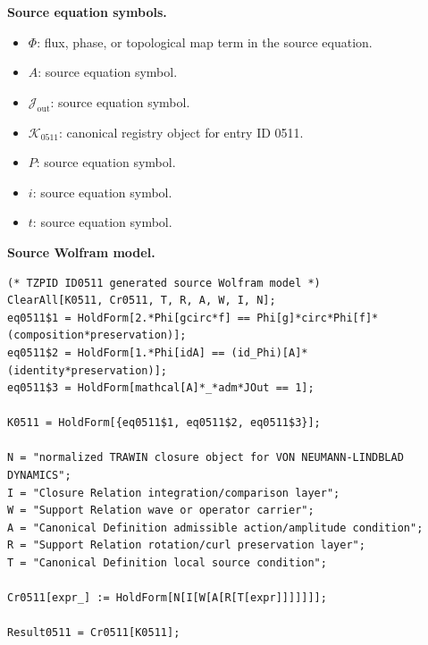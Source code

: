 \begin{minipage}[t]{0.49\linewidth}
\begingroup
\small
\raggedright
\textbf{Source equation symbols.}\par
\begin{itemize}[leftmargin=1.35em,itemsep=1pt,topsep=1pt,parsep=0pt]
    \item $\Phi$: flux, phase, or topological map term in the source equation.
    \item $A$: source equation symbol.
    \item $\mathcal{J}_{\mathrm{out}}$: source equation symbol.
    \item $\mathcal{K}_{0511}$: canonical registry object for entry ID 0511.
    \item $P$: source equation symbol.
    \item $i$: source equation symbol.
    \item $t$: source equation symbol.
\end{itemize}
\endgroup
\end{minipage}\hfill
\begin{minipage}[t]{0.47\linewidth}
\begingroup
\scriptsize
\raggedright
\textbf{Source Wolfram model.}\par
\begin{Verbatim}[fontsize=\tiny,breaklines=true,breakanywhere=true]
(* TZPID ID0511 generated source Wolfram model *)
ClearAll[K0511, Cr0511, T, R, A, W, I, N];
eq0511$1 = HoldForm[2.*Phi[gcirc*f] == Phi[g]*circ*Phi[f]*(composition*preservation)];
eq0511$2 = HoldForm[1.*Phi[idA] == (id_Phi)[A]*(identity*preservation)];
eq0511$3 = HoldForm[mathcal[A]*_*adm*JOut == 1];

K0511 = HoldForm[{eq0511$1, eq0511$2, eq0511$3}];

N = "normalized TRAWIN closure object for VON NEUMANN-LINDBLAD DYNAMICS";
I = "Closure Relation integration/comparison layer";
W = "Support Relation wave or operator carrier";
A = "Canonical Definition admissible action/amplitude condition";
R = "Support Relation rotation/curl preservation layer";
T = "Canonical Definition local source condition";

Cr0511[expr_] := HoldForm[N[I[W[A[R[T[expr]]]]]]];

Result0511 = Cr0511[K0511];
\end{Verbatim}
\endgroup
\end{minipage}

